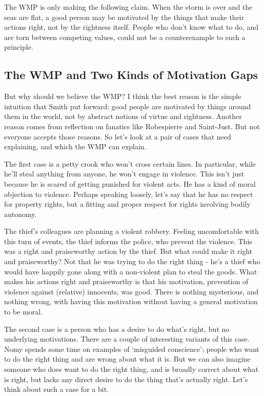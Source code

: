 The WMP is only making the following claim. When the storm is over and the seas are flat, a good person may be motivated by the things that make their actions right, not by the rightness itself. People who don't know what to do, and are torn between competing values, could not be a counterexample to such a principle.

\subsection{The WMP and Two Kinds of Motivation Gaps}
\label{thewmpandtwokindsofmotivationgaps}

But why should we believe the WMP? I think the best reason is the simple intuition that Smith put forward: good people are motivated by things around them in the world, not by abstract notions of virtue and rightness. Another reason comes from reflection on fanatics like \gls{Robespierre} and \gls{Saint-Just}. But not everyone accepts those reasons. So let's look at a pair of cases that need explaining, and which the WMP can explain.

The first case is a petty crook who won't cross certain lines. In particular, while he'll steal anything from anyone, he won't engage in violence. This isn't just because he is scared of getting punished for violent acts. He has a kind of moral objection to violence. Perhaps speaking loosely, let's say that he has no respect for property rights, but a fitting and proper respect for rights involving bodily autonomy.

The thief's colleagues are planning a violent robbery. Feeling uncomfortable with this turn of events, the thief informs the police, who prevent the violence. This was a right and praiseworthy action by the thief. But what could make it right and praiseworthy? Not that he was trying to do the right thing - he's a thief who would have happily gone along with a non-violent plan to steal the goods. What makes his actions right and praiseworthy is that his motivation, prevention of violence against (relative) innocents, was good. There is nothing mysterious, and nothing wrong, with having this motivation without having a general motivation to be moral.

The second case is a person who has a desire to do what's right, but no underlying motivations. There are a couple of interesting variants of this case. Nomy \citet{Arpaly2003} spends some time on examples of `misguided conscience'; people who want to do the right thing and are wrong about what it is. But we can also imagine someone who does want to do the right thing, and is broadly correct about what is right, but lacks any direct desire to do the thing that's actually right. Let's think about such a case for a bit.

